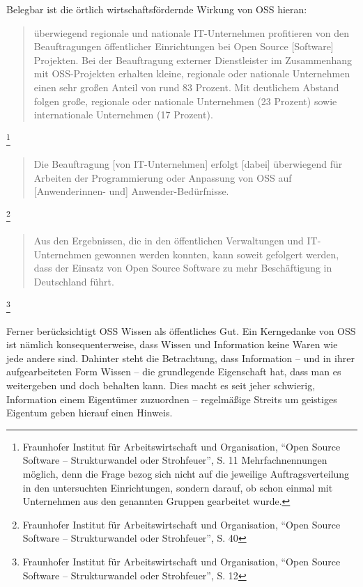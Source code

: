 \documentclass[a4paper]{scrartcl}
\begin{document}
Belegbar ist die örtlich wirtschaftsfördernde Wirkung von OSS hieran:

\begin{quote}überwiegend regionale und nationale IT-Unternehmen profitieren von
  den Beauftragungen öffentlicher Einrichtungen bei Open Source [Software]
  Projekten. Bei der Beauftragung externer Dienstleister im Zusammenhang mit
  OSS-Projekten erhalten kleine, regionale oder nationale Unternehmen einen sehr
  großen Anteil von rund 83 Prozent. Mit deutlichem Abstand folgen große,
  regionale oder nationale Unternehmen (23 Prozent) sowie internationale
  Unternehmen (17 Prozent).\end{quote}\footnote{Fraunhofer Institut für
  Arbeitswirtschaft und Organisation, ``Open Source Software -- Strukturwandel
  oder Strohfeuer'', S. 11 Mehrfachnennungen möglich, denn die Frage bezog sich
  nicht auf die jeweilige Auftragsverteilung in den untersuchten Einrichtungen,
  sondern darauf, ob schon einmal mit Unternehmen aus den genannten Gruppen
  gearbeitet wurde.}

\begin{quote}Die Beauftragung [von IT-Unternehmen] erfolgt [dabei] überwiegend
  für Arbeiten der Programmierung oder Anpassung von OSS auf [Anwenderinnen-
  und] Anwender-Bedürfnisse.\end{quote}\footnote{Fraunhofer Institut für
  Arbeitswirtschaft und Organisation, ``Open Source Software -- Strukturwandel
  oder Strohfeuer'', S. 40}

\begin{quote}Aus den Ergebnissen, die in den öffentlichen Verwaltungen und
  IT-Unternehmen gewonnen werden konnten, kann soweit gefolgert werden, dass der
  Einsatz von Open Source Software zu mehr Beschäftigung in Deutschland
  führt.\end{quote}\footnote{Fraunhofer Institut für Arbeitswirtschaft und
  Organisation, ``Open Source Software -- Strukturwandel oder Strohfeuer'',
  S. 12}

Ferner berücksichtigt OSS Wissen als öffentliches Gut. Ein Kerngedanke von OSS
ist nämlich konsequenterweise, dass Wissen und Information keine Waren wie jede
andere sind. Dahinter steht die Betrachtung, dass Information -- und in ihrer
aufgearbeiteten Form Wissen -- die grundlegende Eigenschaft hat, dass man es
weitergeben und doch behalten kann. Dies macht es seit jeher schwierig,
Information einem Eigentümer zuzuordnen -- regelmäßige Streits um geistiges
Eigentum geben hierauf einen Hinweis.
\end{document}
